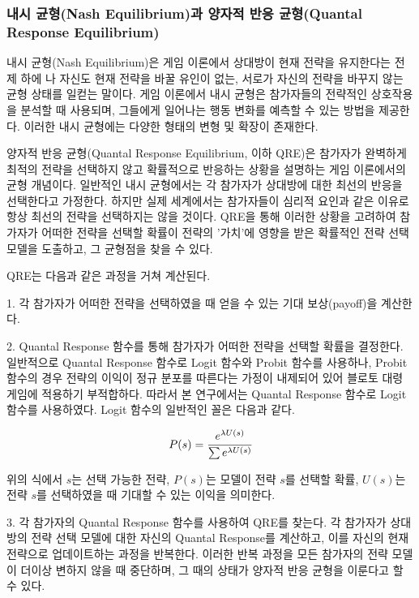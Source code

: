 \subsubsection{내시 균형(Nash Equilibrium)과 양자적 반응 균형(Quantal Response Equilibrium)}
내시 균형(Nash Equilibrium)은 게임 이론에서 상대방이 현재 전략을 유지한다는 전제 하에 나 자신도 현재 전략을 바꿀 유인이 없는, 서로가 자신의 전략을 바꾸지 않는 균형 상태를 일컫는 말이다. 게임 이론에서 내시 균형은 참가자들의 전략적인 상호작용을 분석할 때 사용되며, 그들에게 일어나는 행동 변화를 예측할 수 있는 방법을 제공한다. 이러한 내시 균형에는 다양한 형태의 변형 및 확장이 존재한다.

양자적 반응 균형(Quantal Response Equilibrium, 이하 QRE)은 참가자가 완벽하게 최적의 전략을 선택하지 않고 확률적으로 반응하는 상황을 설명하는 게임 이론에서의 균형 개념이다. 일반적인 내시 균형에서는 각 참가자가 상대방에 대한 최선의 반응을 선택한다고 가정한다. 하지만 실제 세계에서는 참가자들이 심리적 요인과 같은 이유로 항상 최선의 전략을 선택하지는 않을 것이다. QRE을 통해 이러한 상황을 고려하여 참가자가 어떠한 전략을 선택할 확률이 전략의 '가치'에 영향을 받은 확률적인 전략 선택 모델을 도출하고, 그 균형점을 찾을 수 있다.

QRE는 다음과 같은 과정을 거쳐 계산된다.

1. 각 참가자가 어떠한 전략을 선택하였을 때 얻을 수 있는 기대 보상(payoff)을 계산한다.

2. Quantal Response 함수를 통해 참가자가 어떠한 전략을 선택할 확률을 결정한다. 일반적으로 Quantal Response 함수로 Logit 함수와 Probit 함수를 사용하나, Probit 함수의 경우 전략의 이익이 정규 분포를 따른다는 가정이 내제되어 있어 블로토 대령 게임에 적용하기 부적합하다. 따라서 본 연구에서는 Quantal Response 함수로 Logit 함수를 사용하였다. Logit 함수의 일반적인 꼴은 다음과 같다.

$$
P(s)=\cfrac{e^{\lambda U(s)}}{\sum e^{\lambda U(s)}}
$$

위의 식에서 $s$는 선택 가능한 전략, $P(s)$는 모델이 전략 $s$를 선택할 확률, $U(s)$는 전략 $s$를 선택하였을 때 기대할 수 있는 이익을 의미한다.

3. 각 참가자의 Quantal Response 함수를 사용하여 QRE를 찾는다. 각 참가자가 상대방의 전략 선택 모델에 대한 자신의 Quantal Response를 계산하고, 이를 자신의 현재 전략으로 업데이트하는 과정을 반복한다. 이러한 반복 과정을 모든 참가자의 전략 모델이 더이상 변하지 않을 때 중단하며, 그 때의 상태가 양자적 반응 균형을 이룬다고 할 수 있다.